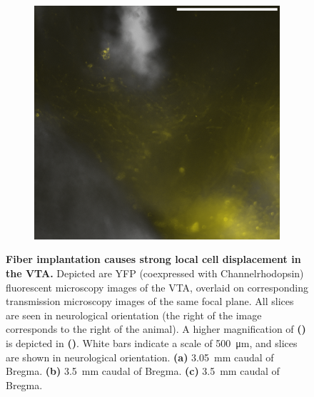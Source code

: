 \begin{figure}[h!]
	\begin{subfigure}{.2728\textwidth}
		\centering
		\includegraphics[width=\textwidth]{img/sub-6589_slice-a4_zoom-10_scene-2_transmission-yfp-comb_straight.png}
                \caption{}
		\label{fig:h6589z}
	\end{subfigure}
        \vspace{-.5em}
	\caption{
		\textbf{Fiber implantation causes strong local cell displacement in the VTA.}
                Depicted are YFP (coexpressed with Channelrhodopsin) fluorescent microscopy images of the VTA, overlaid on corresponding transmission microscopy images of the same focal plane.
                All slices are seen in neurological orientation (the right of the image corresponds to the right of the animal).
                A higher magnification of \textbf{()} is depicted in \textbf{()}.
                White bars indicate a scale of \SI{500}{\micro\meter}, and slices are shown in neurological orientation.
                \textbf{(a)}
                        \SI{3.05}{\milli\meter} caudal of Bregma.
                \textbf{(b)}
			\SI{3.5}{\milli\meter} caudal of Bregma.
                \textbf{(c)}
                        \SI{3.5}{\milli\meter} caudal of Bregma.
                }
	\label{fig:h}
\end{figure}
